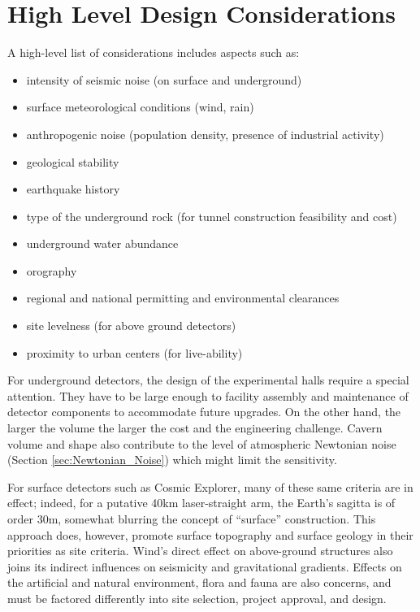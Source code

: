 \section{High Level Design Considerations}
\label{Req:Fac_Inf}
A high-level list of considerations includes aspects such as:
\begin{itemize}
\item intensity of seismic noise (on surface and underground)
\item surface meteorological conditions (wind, rain)
\item anthropogenic noise (population density, presence of industrial activity)
\item geological stability
\item earthquake history
\item type of the underground rock (for tunnel construction feasibility and cost) 
\item underground water abundance
\item orography
\item regional and national permitting and environmental clearances
\item site levelness (for above ground detectors)
\item proximity to urban centers (for live-ability)
\end{itemize}
\newpage
For underground detectors, the design of the %
experimental halls %
require a special attention. They have to be large enough %
to facility assembly and maintenance of detector components %
to accommodate future %
upgrades. On the other hand, the larger the volume the larger the cost and the engineering challenge. Cavern volume and shape also contribute to the level of atmospheric Newtonian noise (Section \ref{sec:Newtonian_Noise}) which might limit the sensitivity.

For surface %
detectors such as Cosmic Explorer, many of these same criteria are in effect; indeed, for a putative 40km laser-straight arm, the Earth’s sagitta is of order 30m, somewhat blurring the concept of “surface” construction. This approach does, however, promote surface topography and surface geology in their priorities as site criteria. Wind’s direct effect on above-ground structures also joins its indirect influences on seismicity and gravitational gradients. Effects on the artificial and natural environment, flora and fauna are also concerns, and must be factored differently into site selection, project approval, and design. 


